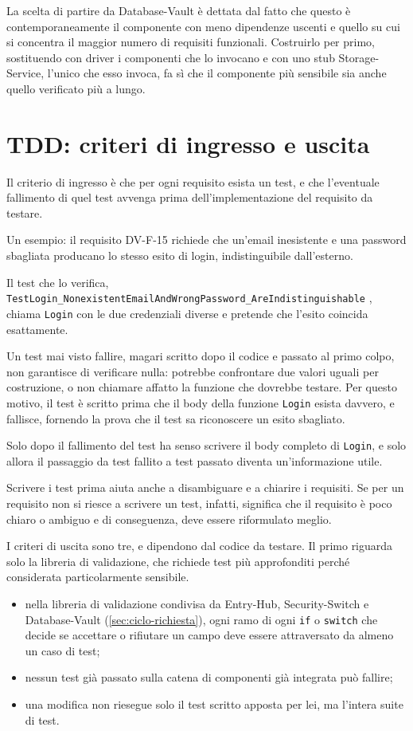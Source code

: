 La scelta di partire da Database-Vault è dettata dal fatto che questo è contemporaneamente il componente 
con meno dipendenze uscenti e quello su cui si concentra il maggior numero di requisiti funzionali. 
Costruirlo per primo, sostituendo con driver i componenti che lo invocano e con uno stub Storage-Service,
l'unico che esso invoca, fa sì che il componente più sensibile sia anche quello verificato più a lungo.


\section{TDD: criteri di ingresso e uscita}

Il criterio di ingresso è che per ogni requisito esista un test, e che l'eventuale fallimento di quel test
avvenga prima dell'implementazione del requisito da testare.

Un esempio: il requisito DV-F-15 richiede che un'email inesistente e una password sbagliata producano lo 
stesso esito di login, indistinguibile dall'esterno.

Il test che lo verifica, \texttt{TestLogin\_NonexistentEmailAndWrongPassword\_AreIndistinguishable}
\cite{ramusb-code-login-test-dv-f-15}, chiama \texttt{Login} con le due credenziali diverse e pretende
che l'esito coincida esattamente.

Un test mai visto fallire, magari scritto dopo il codice e passato al primo colpo, non garantisce di 
verificare nulla: potrebbe confrontare due valori uguali per costruzione, o non chiamare affatto la 
funzione che dovrebbe testare.
Per questo motivo, il test è scritto prima che il body della funzione \texttt{Login} esista davvero, e
fallisce, fornendo la prova che il test sa riconoscere un esito sbagliato.

Solo dopo il fallimento del test ha senso scrivere il body completo di \texttt{Login}, e solo allora il 
passaggio da test fallito a test passato diventa un'informazione utile. 

Scrivere i test prima aiuta anche a disambiguare e a chiarire i requisiti. Se per un
requisito non si riesce a scrivere un test, infatti, significa che il requisito è poco chiaro o ambiguo e 
di conseguenza, deve essere riformulato meglio.

I criteri di uscita sono tre, e dipendono dal codice da testare. Il primo riguarda solo la libreria di
validazione, che richiede test più approfonditi perché considerata particolarmente sensibile.

\begin{itemize}
    \item nella libreria di validazione condivisa da Entry-Hub, Security-Switch e Database-Vault
    (\autoref{sec:ciclo-richiesta}), ogni ramo di ogni \texttt{if} o \texttt{switch} che decide se
    accettare o rifiutare un campo deve essere attraversato da almeno un caso di test;
    \item nessun test già passato sulla catena di componenti già integrata può fallire;
    \item una modifica non riesegue solo il test scritto apposta per lei, ma l'intera suite di test.
\end{itemize}

